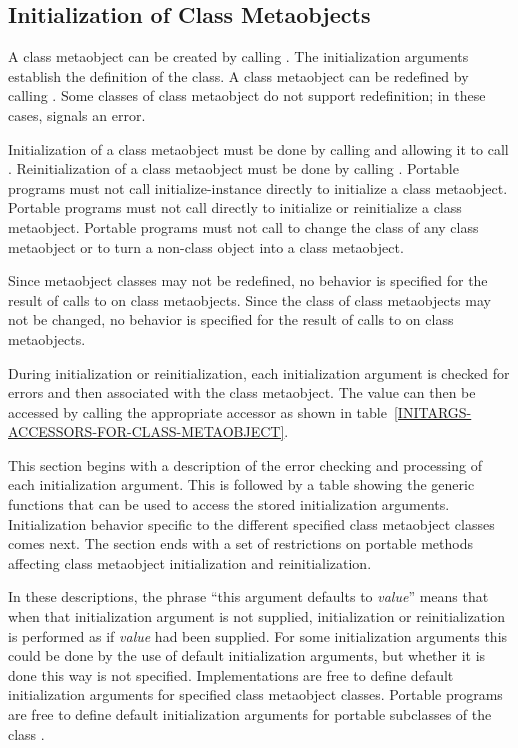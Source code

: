 \subsection{Initialization of Class Metaobjects}
\label{INITIALIZATION-OF-CLASS-METAOBJECTS}

A class metaobject can be created by calling . The
initialization arguments establish the definition of the class. A class
metaobject can be redefined by calling . Some classes
of class metaobject do not support redefinition; in these cases,
 signals an error.

Initialization of a class metaobject must be done by calling 
and allowing it to call . Reinitialization of a class
metaobject must be done by calling . Portable
programs must not call initialize-instance directly to initialize a class
metaobject. Portable programs must not call  directly to
initialize or reinitialize a class metaobject. Portable programs must not call
 to change the class of any class metaobject or to turn a
non-class object into a class metaobject.

Since metaobject classes may not be redefined, no behavior is specified for the
result of calls to  on class
metaobjects. Since the class of class metaobjects may not be changed, no
behavior is specified for the result of calls to
 on class metaobjects.

During initialization or reinitialization, each initialization argument is
checked for errors and then associated with the class metaobject. The value can
then be accessed by calling the appropriate accessor as shown in
table~\ref{INITARGS-ACCESSORS-FOR-CLASS-METAOBJECT}.

This section begins with a description of the error checking and processing of
each initialization argument. This is followed by a table showing the generic
functions that can be used to access the stored initialization
arguments. Initialization behavior specific to the different specified class
metaobject classes comes next. The section ends with a set of restrictions on
portable methods affecting class metaobject initialization and reinitialization.

In these descriptions, the phrase ``this argument defaults to \emph{value}''
means that when that initialization argument is not supplied, initialization or
reinitialization is performed as if \emph{value} had been supplied. For some
initialization arguments this could be done by the use of default initialization
arguments, but whether it is done this way is not specified. Implementations are
free to define default initialization arguments for specified class metaobject
classes. Portable programs are free to define default initialization arguments
for portable subclasses of the class .

